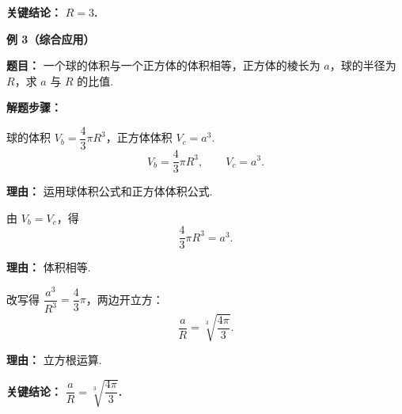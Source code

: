 \begin{examplebox}
	\textbf{\textcolor{CExample}{关键结论：}}
	\textbf{$R=3$.}

	\medskip
	\textbf{\textcolor{CExample}{例 3（综合应用）}}

	\textbf{\textcolor{CExample}{题目：}}
	一个球的体积与一个正方体的体积相等，正方体的棱长为 $a$，球的半径为 $R$，求 $a$ 与 $R$ 的比值.

	\textbf{\textcolor{CExample}{解题步骤：}}
	\begin{description}[style=nextline, leftmargin=2.8em, labelsep=0.5em, itemsep=0.45em]
		\item[\textbf{第一步（写出体积）：}] 球的体积 $V_b = \dfrac{4}{3}\pi R^3$，正方体体积 $V_c = a^3$.
			\[
				V_b = \frac{4}{3}\pi R^3,
				\qquad
				V_c = a^3.
			\]
			\par\textbf{理由：}
			运用球体积公式和正方体体积公式.

		\item[\textbf{第二步（等量关系）：}] 由 $V_b = V_c$，得
			\[
				\frac{4}{3}\pi R^3 = a^3.
			\]
			\par\textbf{理由：}
			体积相等.

		\item[\textbf{第三步（求比值）：}] 改写得 $\dfrac{a^3}{R^3} = \dfrac{4}{3}\pi$，两边开立方：
			\[
				\frac{a}{R} = \sqrt[3]{\frac{4\pi}{3}}.
			\]
			\par\textbf{理由：}
			立方根运算.
	\end{description}

	\textbf{\textcolor{CExample}{关键结论：}}
	\textbf{$\dfrac{a}{R} = \sqrt[3]{\dfrac{4\pi}{3}}$.}
\end{examplebox}
